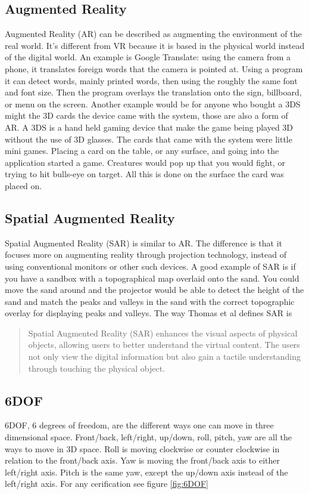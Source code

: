 \documentclass{sig-alternate}
\begin{document}
\subsection{Augmented Reality}
\label{sec:Augmented Reality}
Augmented Reality (AR) can be described as augmenting the environment of the real world. It's different from VR because it is based in the physical world instead of the digital world. An example is Google Translate: using the camera from a phone, it translates foreign words that the camera is pointed at. Using a program it can detect words, mainly printed words, then using the roughly the same font and font size. Then the program overlays the translation onto the sign, billboard, or menu on the screen. Another example would be for anyone who bought a 3DS might the 3D cards the device came with the system, those are also a form of AR. A 3DS is a hand held gaming device that make the game being played 3D without the use of 3D glasses. The cards that came with the system were little mini games. Placing a card on the table, or any surface, and going into the application started a game. Creatures would pop up that you would fight, or trying to hit bulls-eye on target. All this is done on the surface the card was placed on.     

\subsection{Spatial Augmented Reality}
\label{sec:Spatial Augmented Reality}
Spatial Augmented Reality (SAR) is similar to AR. The difference is that it focuses more on augmenting reality through projection technology, instead of using conventional monitors or other such devices. A good example of SAR is if you have a sandbox with a topographical map overlaid onto the sand. You could move the sand around and the projector would be able to detect the height of the sand and match the peaks and valleys in the sand with the correct topographic overlay for displaying peaks and valleys. The way Thomas et al \cite{3D} defines SAR is 
\begin{quote}
Spatial Augmented Reality (SAR) enhances the visual aspects of physical objects, allowing users to better understand the virtual content. The users not only view the digital information but also gain a tactile understanding through touching the physical object.
\end{quote}

\subsection{6DOF}
\label{sec:6DOF}
6DOF, 6 degrees of freedom, are the different ways one can move in three dimensional space. Front/back, left/right, up/down, roll, pitch, yaw are all the ways to move in 3D space. Roll is moving clockwise or counter clockwise in relation to the front/back axis. Yaw is moving the front/back axis to either left/right axis. Pitch is the same yaw, except the up/down axis instead of the left/right axis. For any cerification see figure \ref{fig:6DOF}
\end{document}
